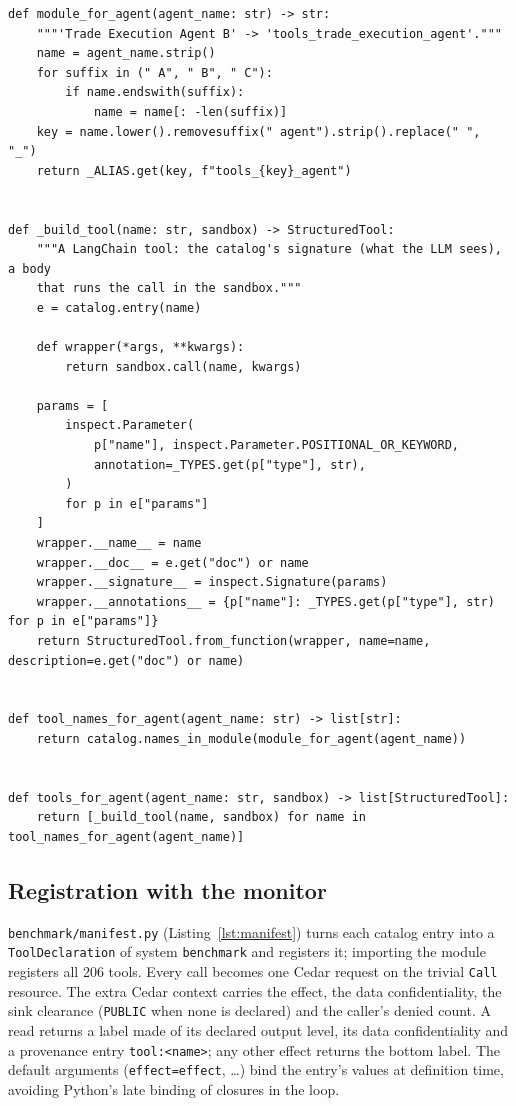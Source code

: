 \documentclass[11pt,a4paper]{article}
\DeclareRobustCommand{\code}[1]{{\renewcommand{\_}{\textunderscore\allowbreak}\texttt{#1}}}
\begin{document}
\begin{lstlisting}[firstnumber=28,style=py,caption={Generating tools from the catalog (\texttt{benchmark/tools.py}, lines 28--65)},label={lst:tools}]
def module_for_agent(agent_name: str) -> str:
    """'Trade Execution Agent B' -> 'tools_trade_execution_agent'."""
    name = agent_name.strip()
    for suffix in (" A", " B", " C"):
        if name.endswith(suffix):
            name = name[: -len(suffix)]
    key = name.lower().removesuffix(" agent").strip().replace(" ", "_")
    return _ALIAS.get(key, f"tools_{key}_agent")


def _build_tool(name: str, sandbox) -> StructuredTool:
    """A LangChain tool: the catalog's signature (what the LLM sees), a body
    that runs the call in the sandbox."""
    e = catalog.entry(name)

    def wrapper(*args, **kwargs):
        return sandbox.call(name, kwargs)

    params = [
        inspect.Parameter(
            p["name"], inspect.Parameter.POSITIONAL_OR_KEYWORD,
            annotation=_TYPES.get(p["type"], str),
        )
        for p in e["params"]
    ]
    wrapper.__name__ = name
    wrapper.__doc__ = e.get("doc") or name
    wrapper.__signature__ = inspect.Signature(params)
    wrapper.__annotations__ = {p["name"]: _TYPES.get(p["type"], str) for p in e["params"]}
    return StructuredTool.from_function(wrapper, name=name, description=e.get("doc") or name)


def tool_names_for_agent(agent_name: str) -> list[str]:
    return catalog.names_in_module(module_for_agent(agent_name))


def tools_for_agent(agent_name: str, sandbox) -> list[StructuredTool]:
    return [_build_tool(name, sandbox) for name in tool_names_for_agent(agent_name)]
\end{lstlisting}

\subsection{Registration with the monitor}
\label{sec:manifest}

\code{benchmark/manifest.py} (Listing~\ref{lst:manifest}) turns each catalog entry into a
\code{ToolDeclaration} of system \code{benchmark} and registers it; importing the module
registers all 206 tools. Every call becomes one Cedar request on the trivial \code{Call}
resource. The extra Cedar context carries the effect, the data confidentiality, the sink
clearance (\code{PUBLIC} when none is declared) and the caller's denied count. A read
returns a label made of its declared output level, its data confidentiality and a
provenance entry \code{tool:<name>}; any other effect returns the bottom label. The
default arguments (\code{\_effect=effect}, \ldots) bind the entry's values at definition
time, avoiding Python's late binding of closures in the loop.
\end{document}

